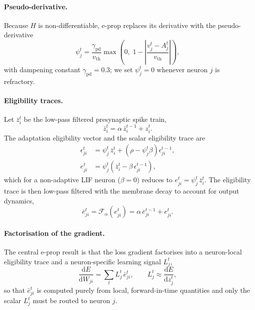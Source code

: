 \paragraph{Pseudo-derivative.}
Because $H$ is non-differentiable, e-prop replaces its derivative with the
pseudo-derivative
\begin{equation}
\psi^t_j = \frac{\gamma_{\mathrm{pd}}}{v_{\mathrm{th}}}
\max\!\left(0,\; 1 - \left|\frac{v^t_j - A^t_j}{v_{\mathrm{th}}}\right|\right),
\label{eq:pseudo}
\end{equation}
with dampening constant $\gamma_{\mathrm{pd}} = 0.3$; we set $\psi^t_j = 0$
whenever neuron $j$ is refractory.

\paragraph{Eligibility traces.}
Let $\bar{z}^t_i$ be the low-pass filtered presynaptic spike train,
\begin{equation}
\bar{z}^t_i = \alpha\, \bar{z}^{t-1}_i + z^t_i .
\label{eq:zfilter}
\end{equation}
The adaptation eligibility vector and the scalar eligibility trace are
\begin{align}
\epsilon^t_{ji} &= \psi^t_j\, \bar{z}^t_i + \left(\rho - \psi^t_j \beta\right)\epsilon^{t-1}_{ji}, \label{eq:eps}\\
e^t_{ji}        &= \psi^t_j\!\left(\bar{z}^t_i - \beta\, \epsilon^{t-1}_{ji}\right), \label{eq:elig}
\end{align}
which for a non-adaptive LIF neuron ($\beta = 0$) reduces to
$e^t_{ji} = \psi^t_j\, \bar{z}^t_i$. The eligibility trace is then low-pass
filtered with the membrane decay to account for output dynamics,
\begin{equation}
\bar{e}^t_{ji} = \mathcal{F}_\alpha\!\left(e^t_{ji}\right)
= \alpha\, \bar{e}^{t-1}_{ji} + e^t_{ji}.
\label{eq:elig-filtered}
\end{equation}

\paragraph{Factorisation of the gradient.}
The central e-prop result is that the loss gradient factorises into a
neuron-local eligibility trace and a neuron-specific learning signal $L^t_j$,
\begin{equation}
\frac{\mathrm{d}E}{\mathrm{d}W_{ji}} = \sum_t L^t_j\, \bar{e}^t_{ji},
\qquad
L^t_j \approx \frac{\mathrm{d}E}{\mathrm{d}z^t_j},
\label{eq:eprop-factorisation}
\end{equation}
so that $\bar{e}^t_{ji}$ is computed purely from local, forward-in-time
quantities and only the scalar $L^t_j$ must be routed to neuron $j$.

